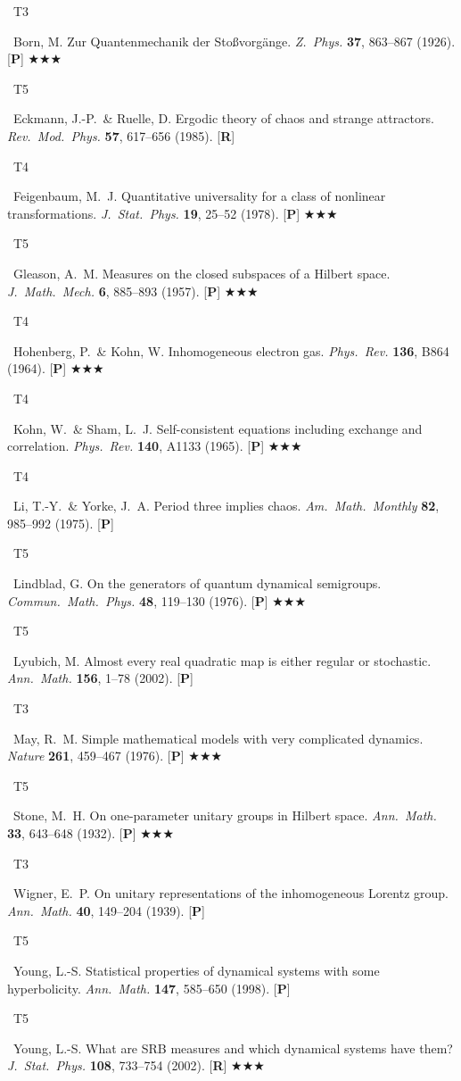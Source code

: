 \documentclass[11pt,a4paper]{article}
\newcommand{\tierbadge}[2]{%
  \colorbox{#1}{\small\bfseries\color{white}\strut\ #2\ }%
}
\newcommand{\essential}{$\bigstar\bigstar\bigstar$}
\begin{document}
\begin{tcolorbox}[catbox]
\begin{enumerate}[leftmargin=2.5em, label=\textbf{[E\arabic*]}, itemsep=5pt]
  \item \tierbadge{t3purple}{T3}\ Born, M. Zur Quantenmechanik der Sto\ss vorg\"ange. \textit{Z.~Phys.} \textbf{37}, 863--867 (1926). [\textbf{P}] \essential
  \item \tierbadge{t5red}{T5}\ Eckmann, J.-P.\ \& Ruelle, D. Ergodic theory of chaos and strange attractors. \textit{Rev.~Mod.~Phys.} \textbf{57}, 617--656 (1985). [\textbf{R}]
  \item \tierbadge{t4orange}{T4}\ Feigenbaum, M.~J. Quantitative universality for a class of nonlinear transformations. \textit{J.~Stat.~Phys.} \textbf{19}, 25--52 (1978). [\textbf{P}] \essential
  \item \tierbadge{t5red}{T5}\ Gleason, A.~M. Measures on the closed subspaces of a Hilbert space. \textit{J.~Math.~Mech.} \textbf{6}, 885--893 (1957). [\textbf{P}] \essential
  \item \tierbadge{t4orange}{T4}\ Hohenberg, P.\ \& Kohn, W. Inhomogeneous electron gas. \textit{Phys.~Rev.} \textbf{136}, B864 (1964). [\textbf{P}] \essential
  \item \tierbadge{t4orange}{T4}\ Kohn, W.\ \& Sham, L.~J. Self-consistent equations including exchange and correlation. \textit{Phys.~Rev.} \textbf{140}, A1133 (1965). [\textbf{P}] \essential
  \item \tierbadge{t4orange}{T4}\ Li, T.-Y.\ \& Yorke, J.~A. Period three implies chaos. \textit{Am.~Math.~Monthly} \textbf{82}, 985--992 (1975). [\textbf{P}]
  \item \tierbadge{t5red}{T5}\ Lindblad, G. On the generators of quantum dynamical semigroups. \textit{Commun.~Math.~Phys.} \textbf{48}, 119--130 (1976). [\textbf{P}] \essential
  \item \tierbadge{t5red}{T5}\ Lyubich, M. Almost every real quadratic map is either regular or stochastic. \textit{Ann.~Math.} \textbf{156}, 1--78 (2002). [\textbf{P}]
  \item \tierbadge{t3purple}{T3}\ May, R.~M. Simple mathematical models with very complicated dynamics. \textit{Nature} \textbf{261}, 459--467 (1976). [\textbf{P}] \essential
  \item \tierbadge{t5red}{T5}\ Stone, M.~H. On one-parameter unitary groups in Hilbert space. \textit{Ann.~Math.} \textbf{33}, 643--648 (1932). [\textbf{P}] \essential
  \item \tierbadge{t3purple}{T3}\ Wigner, E.~P. On unitary representations of the inhomogeneous Lorentz group. \textit{Ann.~Math.} \textbf{40}, 149--204 (1939). [\textbf{P}]
  \item \tierbadge{t5red}{T5}\ Young, L.-S. Statistical properties of dynamical systems with some hyperbolicity. \textit{Ann.~Math.} \textbf{147}, 585--650 (1998). [\textbf{P}]
  \item \tierbadge{t5red}{T5}\ Young, L.-S. What are SRB measures and which dynamical systems have them? \textit{J.~Stat.~Phys.} \textbf{108}, 733--754 (2002). [\textbf{R}] \essential
\end{enumerate}
\end{tcolorbox}
\end{document}
